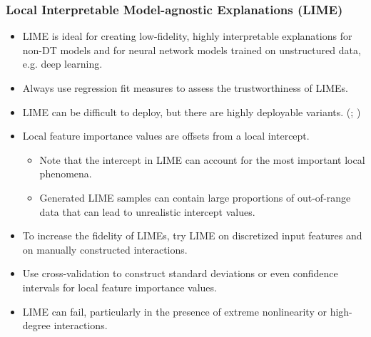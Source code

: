 \documentclass[11pt,aspectratio=169,hyperref={colorlinks}]{beamer}
\begin{document}
	\begin{frame}
		
		\frametitle{Local Interpretable Model-agnostic Explanations (LIME)}
		
		\begin{itemize}
			
			\item LIME is ideal for creating low-fidelity, highly interpretable explanations for non-DT models and for neural network models trained on unstructured data, e.g. deep learning.
			
			\item Always use regression fit measures to assess the trustworthiness of LIMEs.
			
			\item LIME can be difficult to deploy, but there are highly deployable variants. (\cite{lime-sup}; \cite{h2o_mli_booklet})
			
			\item Local feature importance values are offsets from a local intercept.
			
			\begin{itemize}
				
				\item Note that the intercept in LIME can account for the most important local phenomena.
				
				\item Generated LIME samples can contain large proportions of out-of-range data that can lead to unrealistic intercept values. 
				
			\end{itemize}
			
		\end{itemize}
		
	\end{frame}

	\begin{frame}[t]
		
		\begin{itemize}
			
			\item To increase the fidelity of LIMEs, try LIME on discretized input features and on manually constructed interactions.
			
			\item Use cross-validation to construct standard deviations or even confidence intervals for local feature importance values.
			
			\item LIME can fail, particularly in the presence of extreme nonlinearity or high-degree interactions.
			
		\end{itemize}
		
	\end{frame}
\end{document}
